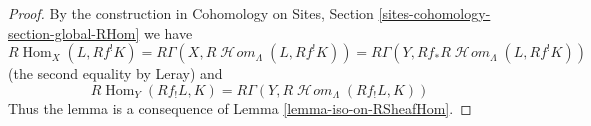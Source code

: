 \documentclass{stacks-project}
\theoremstyle{plain}
\theoremstyle{definition}
\theoremstyle{remark}
\numberwithin{equation}{subsection}
\def\Hom{\mathop{\mathrm{Hom}}\nolimits}
\def\SheafHom{\mathop{\mathcal{H}\!\mathit{om}}\nolimits}
\begin{document}
\begin{proof}
By the construction in
Cohomology on Sites, Section \ref{sites-cohomology-section-global-RHom}
we have
$$
R\Hom_X(L, Rf^!K) =
R\Gamma(X, R\SheafHom_\Lambda(L, Rf^!K)) =
R\Gamma(Y, Rf_*R\SheafHom_\Lambda(L, Rf^!K))
$$
(the second equality by Leray) and
$$
R\Hom_Y(Rf_!L, K) = R\Gamma(Y, R\SheafHom_\Lambda(Rf_!L, K))
$$
Thus the lemma is a consequence of Lemma \ref{lemma-iso-on-RSheafHom}.
\end{proof}
\end{document}

